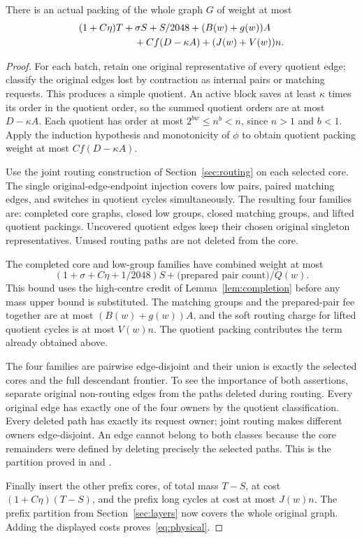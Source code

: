 \begin{lemma}\label{lem:physical}
There is an actual packing of the whole graph $G$ of weight at most
\begin{align}
 &(1+C\eta)T+\sigma S+S/2048+(B(w)+g(w))A\notag\\
 &\hspace{20mm}+Cf(D-\kappa A)+(J(w)+V(w))n.\label{eq:physical}
\end{align}
\end{lemma}
\begin{proof}
For each batch, retain one original representative of every quotient edge;
classify the original edges lost by contraction as internal pairs or
matching requests. This produces a simple quotient. An active block saves
at least $\kappa$ times its order in the quotient order, so the summed
quotient orders are at most $D-\kappa A$. Each quotient has order at most
$2^{bw}\le n^b<n$, since $n>1$ and $b<1$. Apply the induction hypothesis
and monotonicity of $\phi$ to obtain quotient packing weight at most
$Cf(D-\kappa A)$.

Use the joint routing construction of Section~\ref{sec:routing} on each
selected core. The single original-edge-endpoint injection covers low
pairs, paired matching edges, and switches in quotient cycles simultaneously.
The resulting four families are: completed core graphs, closed low groups,
closed matching groups, and lifted quotient packings. Uncovered quotient
edges keep their chosen original singleton representatives. Unused routing
paths are not deleted from the core.

The completed core and low-group families have combined weight at most
\[
 (1+\sigma+C\eta+1/2048)S
                  +\text{(prepared pair count)}/Q(w).
\]
This bound uses the high-centre credit of Lemma~\ref{lem:completion}
before any mass upper bound is substituted. The matching groups and the
prepared-pair fee together are at most $(B(w)+g(w))A$, and the soft routing
charge for lifted quotient cycles is at most $V(w)n$. The quotient packing
contributes the term already obtained above.

The four families are pairwise edge-disjoint and their union is exactly
the selected cores and the full descendant frontier. To see the importance
of both assertions, separate original non-routing edges from the paths
deleted during routing. Every original edge has exactly one of the four
owners by the quotient classification. Every deleted path has exactly its
request owner; joint routing makes different owners edge-disjoint. An edge
cannot belong to both classes because the core remainders were defined by
deleting precisely the selected paths. This is the partition proved in
 and .

Finally insert the other prefix cores, of total mass $T-S$, at cost
$(1+C\eta)(T-S)$, and the prefix long cycles at cost at most $J(w)n$.
The prefix partition from Section~\ref{sec:layers} now covers the whole
original graph. Adding the displayed costs proves~\eqref{eq:physical}.
\end{proof}

